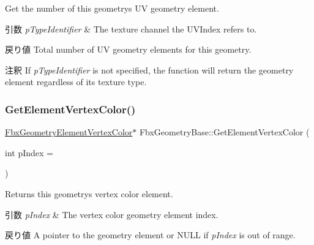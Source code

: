 Get the number of this geometry\textquotesingle{}s UV geometry element. 
\begin{DoxyParams}{引数}
{\em p\+Type\+Identifier} & The texture channel the U\+V\+Index refers to. \\
\hline
\end{DoxyParams}
\begin{DoxyReturn}{戻り値}
Total number of UV geometry elements for this geometry. 
\end{DoxyReturn}
\begin{DoxyRemark}{注釈}
If {\itshape p\+Type\+Identifier} is not specified, the function will return the geometry element regardless of its texture type. 
\end{DoxyRemark}
\mbox{\label{class_fbx_geometry_base_a1b93a0dc9da34d479e5535d7d589fe0b}} 
\subsubsection{\texorpdfstring{Get\+Element\+Vertex\+Color()}{GetElementVertexColor()}\hspace{0.1cm}{\footnotesize\ttfamily [1/2]}}
{\footnotesize\ttfamily \hyperlink{fbxlayer_8h_a4baddeaf720350758d230973d114f593}{Fbx\+Geometry\+Element\+Vertex\+Color}$\ast$ Fbx\+Geometry\+Base\+::\+Get\+Element\+Vertex\+Color (\begin{DoxyParamCaption}\item[{int}]{p\+Index = {} }\end{DoxyParamCaption})}

Returns this geometry\textquotesingle{}s vertex color element. 
\begin{DoxyParams}{引数}
{\em p\+Index} & The vertex color geometry element index. \\
\hline
\end{DoxyParams}
\begin{DoxyReturn}{戻り値}
A pointer to the geometry element or {\ttfamily N\+U\+LL} if {\itshape p\+Index} is out of range. 
\end{DoxyReturn}
\mbox{\label{class_fbx_geometry_base_ac4748b1ed1007746aa7acf2f4c300d9f}} 
